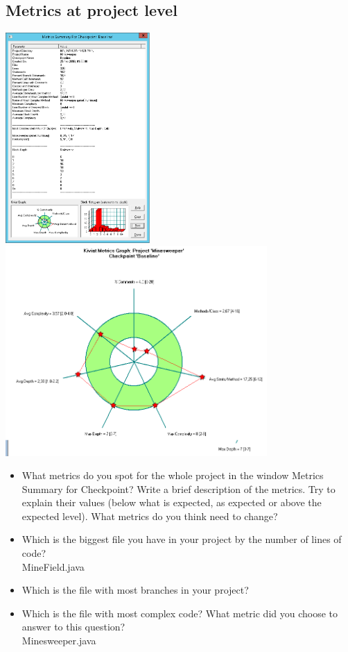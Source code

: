 \documentclass[UKenglish]{article}  %
\begin{document}
\subsection{Metrics at project level}
\includegraphics[height=8cm]{metric_summary}
\includegraphics[height=8cm]{kiviat_diagram_baseline}
\begin{itemize}
\item What metrics do you spot for the whole project in the window Metrics Summary for Checkpoint? Write a brief description of the metrics. Try to explain their values (below what is expected, as expected or above the expected level). What metrics do you think need to change?\\
\item Which is the biggest file you have in your project by the number of lines of code? \\
MineField.java
\item Which is the file with most branches in your project?\\
\item Which is the file with most complex code? What metric did you choose to answer to this question?\\
Minesweeper.java
\end{itemize}
\end{document}
